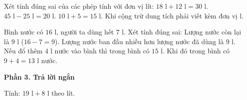 \begin{ex} %
Xét tính đúng sai của các phép tính với đơn vị lít:
\choiceTF
{\True $18\text{ l} + 12\text{ l} = 30\text{ l}$.}
{\True $45\text{ l} - 25\text{ l} = 20\text{ l}$.}
{$10\text{ l} + 5 = 15\text{ l}$.}
{\True Khi cộng trừ dung tích phải viết kèm đơn vị $\text{l}$.}
\end{ex}

\begin{ex} %
Bình nước có $16\text{ l}$, người ta dùng hết $7\text{ l}$. Xét tính đúng sai:
\choiceTF
{\True Lượng nước còn lại là $9\text{ l}$ ($16 - 7 = 9$).}
{\True Lượng nước ban đầu nhiều hơn lượng nước đã dùng là $9\text{ l}$.}
{Nếu đổ thêm $4\text{ l}$ nước vào bình thì trong bình có $15\text{ l}$.}
{\True Khi đó trong bình có $9 + 4 = 13\text{ l}$ nước.}
\end{ex}

\textbf{Phần 3. Trả lời ngắn}

\begin{ex} %
Tính: $19\text{ l} + 8\text{ l}$ theo lít.
\end{ex}

